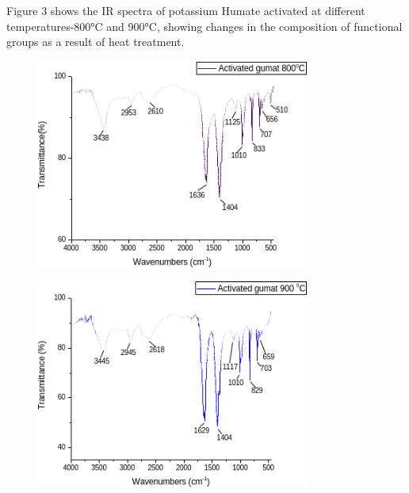 Figure 3 shows the IR spectra of potassium Humate activated at different
temperatures-800°C and 900°C, showing changes in the composition of
functional groups as a result of heat treatment.

\begin{figure}[H]
	\centering
	\includegraphics[width=0.8\textwidth]{media/chem2/image99}
	\caption*{}
\end{figure}

\begin{figure}[H]
	\centering
	\includegraphics[width=0.8\textwidth]{media/chem2/image100}
	\caption*{}
\end{figure}

